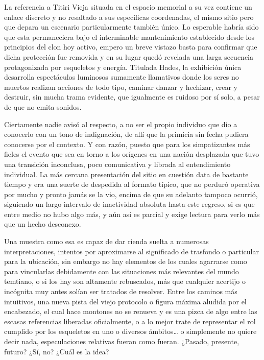 \documentclass[
]{book}
\begin{document}
La referencia a Titiri Vieja situada en el espacio memorial a su vez contiene un enlace discreto y no resaltado a sus específicas coordenadas, el mismo sitio pero que depara un escenario particularmente también único. Lo esperable habría sido que esta permaneciera bajo el interminable mantenimiento establecido desde los principios del clon hoy activo, empero un breve vistazo basta para confirmar que dicha protección fue removida y en su lugar quedó revelada una larga secuencia protagonizada por esqueletos y energía. Titulada Hades, la exhibición única desarrolla espectáculos luminosos sumamente llamativos donde los seres no muertos realizan acciones de todo tipo, caminar danzar y hechizar, crear y destruir, sin mucha trama evidente, que igualmente es ruidoso por sí solo, a pesar de que no emita sonidos.

Ciertamente nadie avisó al respecto, a no ser el propio individuo que dio a conocerlo con un tono de indignación, de allí que la primicia sin fecha pudiera conocerse por el contexto. Y con razón, puesto que para los simpatizantes más fieles el evento que sea en torno a los orígenes en una nación desplazada que tuvo una transición inconclusa, poco comunicativa y librada al entendimiento individual. La más cercana presentación del sitio en cuestión data de bastante tiempo y era una suerte de despedida al formato típico, que no perduró operativa por mucho y pronto jamás se la vio, encima de que su adelanto tampoco ocurrió, siguiendo un largo intervalo de inactividad absoluta hasta este regreso, si es que entre medio no hubo algo más, y aún así es parcial y exige lectura para verlo más que un hecho desconexo.

Una muestra como esa es capaz de dar rienda suelta a numerosas interpretaciones, intentos por aproximarse al significado de trasfondo o particular para la ubicación, sin embargo no hay elementos de los cuales agarrarse como para vincularlas debidamente con las situaciones más relevantes del mundo temtiano, o si los hay son altamente rebuscados, más que cualquier acertijo o incógnita muy antes solían ser tratados de resolver. Entre los caminos más intuitivos, una nueva pista del viejo protocolo o figura máxima aludida por el encabezado, el cual hace montones no se renueva y es una pizca de algo entre las escasas referencias liberadas oficialmente, o a lo mejor trate de representar el rol cumplido por los esqueletos en uno o diversos ámbitos\ldots{} o simplemente no quiere decir nada, especulaciones relativas fueran como fueran. ¿Pasado, presente, futuro? ¿Sí, no? ¿Cuál es la idea?
\end{document}

